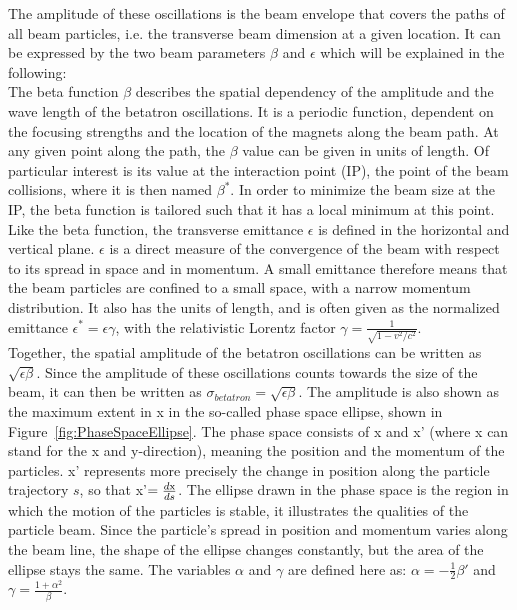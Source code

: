 The amplitude of these oscillations is the beam envelope that covers the paths of all beam particles, i.e. the transverse beam dimension at a given location.
It can be expressed by the two beam parameters $\beta$ and $\epsilon$ which will be explained in the following:\\
The beta function $\beta$ describes the spatial dependency of the amplitude and the wave length of the betatron oscillations.
It is a periodic function, dependent on the focusing strengths and the location of the magnets along the beam path.
At any given point along the path, the $\beta$ value can be given in units of length.
Of particular interest is its value at the interaction point (IP), the point of the beam collisions, where it is then named $\beta^*$.
In order to minimize the beam size at the IP, the beta function is tailored such that it has a local minimum at this point.  
\\
Like the beta function, the transverse emittance $\epsilon$ is defined in the horizontal and vertical plane.
$\epsilon$ is a direct measure of the convergence of the beam with respect to its spread in space and in momentum.
A small emittance therefore means that the beam particles are confined to a small space, with a narrow momentum distribution.
It also has the units of length, and is often given as the normalized emittance $\epsilon^* = \epsilon\gamma$, with the relativistic Lorentz factor $\gamma=\frac{1}{\sqrt{1-v^2/c^2}}$.\\
Together, the spatial amplitude of the betatron oscillations can be written as $\sqrt{\epsilon\beta}$.
Since the amplitude of these oscillations counts towards the size of the beam, it can then be written as $\sigma_{betatron} = \sqrt{\epsilon\beta}$.
The amplitude is also shown as the maximum extent in x in the so-called phase space ellipse, shown in Figure~\ref{fig:PhaseSpaceEllipse}.
The phase space consists of x and x' (where x can stand for the x and y-direction), meaning the position and the momentum of the particles.
x' represents more precisely the change in position along the particle trajectory $s$, so that x'$=\frac{d\rm{x}}{ds}$.
The ellipse drawn in the phase space is the region in which the motion of the particles is stable, it illustrates the qualities of the particle beam.
Since the particle's spread in position and momentum varies along the beam line, the shape of the ellipse changes constantly, but the area of the ellipse stays the same.
The variables $\alpha$ and $\gamma$ are defined here as: $\alpha = -\frac12\beta'$ and $\gamma = \frac{1+\alpha^2}{\beta}$.~\cite[cf. p. 283ff]{Wangler}
